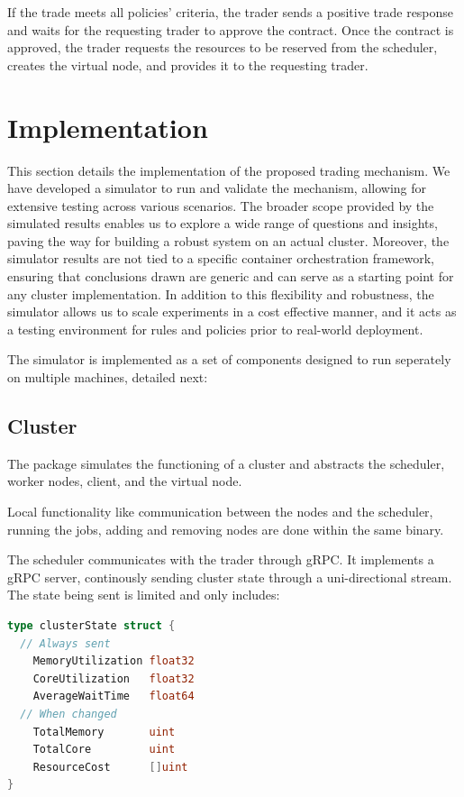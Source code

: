 If the trade meets all policies' criteria, the trader sends a positive trade
response and waits for the requesting trader to approve the contract. Once the
contract is approved, the trader requests the resources to be reserved from the
scheduler, creates the virtual node, and provides it to the requesting trader. 

\section{Implementation} 
This section details the implementation of the proposed trading mechanism. We
have developed a simulator to run and validate the mechanism, allowing for
extensive testing across various scenarios. The broader scope provided by the
simulated results enables us to explore a wide range of questions and insights,
paving the way for building a robust system on an actual cluster. Moreover, the
simulator results are not tied to a specific container orchestration framework,
ensuring that conclusions drawn are generic and can serve as a starting point
for any cluster implementation. In addition to this flexibility and robustness,
the simulator allows us to scale experiments in a cost effective manner, and it
acts as a testing environment for rules and policies prior to real-world
deployment.

The simulator is implemented as a set of components designed to run
seperately on multiple machines, detailed next:

\subsection{Cluster}

The package simulates the functioning of a cluster and abstracts the scheduler,
worker nodes, client, and the virtual node. 

Local functionality like communication between the nodes and the scheduler,
running the jobs, adding and removing nodes are done within the same binary.

The scheduler communicates with the trader through gRPC. It implements a
gRPC server, continously sending cluster state through a uni-directional stream.
The state being sent is limited and only includes:

\begin{lstlisting}[language=go]
type clusterState struct {
  // Always sent 
	MemoryUtilization float32
	CoreUtilization   float32
	AverageWaitTime   float64
  // When changed
    TotalMemory       uint
	TotalCore         uint
    ResourceCost      []uint
}
\end{lstlisting}

